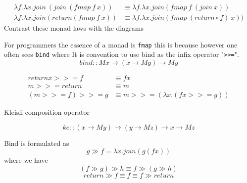 \documentclass[a4paper,10pt]{article}
\theoremstyle{definition}
\begin{document}
\begin{equation}
  \begin{split}
      \lambda f.\lambda x.join\ (join\ (fmap\ f\ x))
      &\equiv
      \lambda f.\lambda x.join(fmap\ f\ (join\ x))
      \\
      \lambda f.\lambda x.join(return (fmap\ f\ x))
      &\equiv
      \lambda f.\lambda x.join(fmap\ (return \circ f)\ x))
  \end{split}
\end{equation}
Contrast these monad laws with the diagrams
\begin{center}
    \quad
\end{center}

For programmers the essence of a monad is \texttt{fmap}
this is because
however one often sees \texttt{bind} where
It is convention to use bind as the infix operator "\texttt{>>=}".
\begin{equation}
    bind :: M x \rightarrow (x \rightarrow M y) \rightarrow M y
\end{equation}

\begin{equation}
  \begin{split}
      return x >>= f      &\equiv f x \\
             m >>= return &\equiv m   \\
      (m >>= f) >>= g     &\equiv m >>= (\lambda x.(fx >>= g))
  \end{split}
\end{equation}

Kleisli composition operator

\begin{equation}
    kc   :: (x \rightarrow M y) \rightarrow (y \rightarrow M z) \rightarrow x \rightarrow M z
\end{equation}

Bind is formulated as
\begin{equation}
    g \gg f = \lambda x. join (g (f x))
\end{equation}
where we have
\begin{equation}
    (f \gg g) \gg h \equiv f \gg (g \gg h)
\end{equation}
\begin{equation}
    return \gg f \equiv f \equiv f \gg return
\end{equation}
\end{document}

